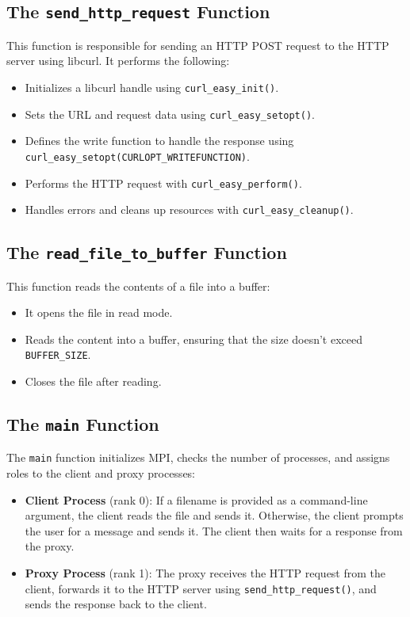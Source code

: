 \documentclass[a4paper,12pt]{article}
\begin{document}
\subsection{The \texttt{send\_http\_request} Function}
This function is responsible for sending an HTTP POST request to the HTTP server using libcurl. It performs the following:
\begin{itemize}
    \item Initializes a libcurl handle using \texttt{curl\_easy\_init()}.
    \item Sets the URL and request data using \texttt{curl\_easy\_setopt()}.
    \item Defines the write function to handle the response using \texttt{curl\_easy\_setopt(CURLOPT\_WRITEFUNCTION)}.
    \item Performs the HTTP request with \texttt{curl\_easy\_perform()}.
    \item Handles errors and cleans up resources with \texttt{curl\_easy\_cleanup()}.
\end{itemize}

\subsection{The \texttt{read\_file\_to\_buffer} Function}
This function reads the contents of a file into a buffer:
\begin{itemize}
    \item It opens the file in read mode.
    \item Reads the content into a buffer, ensuring that the size doesn't exceed \texttt{BUFFER\_SIZE}.
    \item Closes the file after reading.
\end{itemize}

\subsection{The \texttt{main} Function}
The \texttt{main} function initializes MPI, checks the number of processes, and assigns roles to the client and proxy processes:
\begin{itemize}
    \item \textbf{Client Process} (rank 0): If a filename is provided as a command-line argument, the client reads the file and sends it. Otherwise, the client prompts the user for a message and sends it. The client then waits for a response from the proxy.
    \item \textbf{Proxy Process} (rank 1): The proxy receives the HTTP request from the client, forwards it to the HTTP server using \texttt{send\_http\_request()}, and sends the response back to the client.
\end{itemize}
\end{document}
